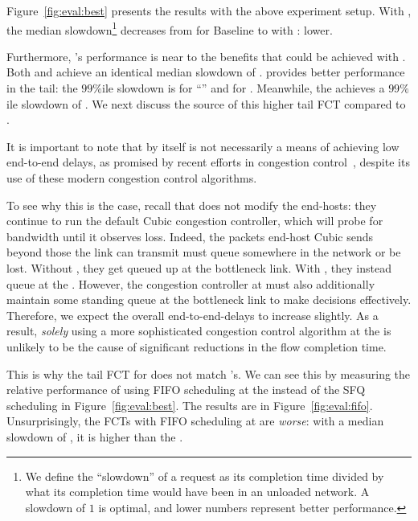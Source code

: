 Figure~\ref{fig:eval:best} presents the results with the above experiment setup.
With \name, the median 
slowdown\footnote{We define the ``slowdown'' of a request as its completion time divided by what its completion time would have been in an unloaded network. A slowdown of $1$ is optimal, and lower numbers represent better performance.} 
decreases from \overviewBenefitsBaselineMedian 
for Baseline to \overviewBenefitsBundlerMedian 
with \name: \overviewBenefitsBundlerMedianImprovement
lower.

Furthermore, \name's performance is near to the benefits that could be achieved with \optimal.
Both \name and \optimal achieve an identical median slowdown of \overviewBenefitsBundlerMedian.
\optimal provides better performance in the tail: the $99\%$ile slowdown is \overviewBenefitsOptimalTail for ``\optimal'' and \overviewBenefitsBundlerTail for \name.
Meanwhile, the \baseline achieves a $99\%$ile slowdown of \overviewBenefitsBaselineTail.
We next discuss the source of this higher tail FCT compared to \optimal.

 It is important to note that \name by itself is not necessarily a means of achieving low end-to-end delays, as promised by recent efforts in congestion control~\cite{copa, nimbus}, despite its use of these modern congestion control algorithms.

To see why this is the case, recall that \name does not modify the end-hosts: they continue to run the default Cubic congestion controller, which will probe for bandwidth until it observes loss.
Indeed, the packets end-host Cubic sends beyond those the link can transmit must queue somewhere in the network or be lost. Without \name, they get queued up at the bottleneck link.
With \name, they instead queue at the \inbox.
However, the congestion controller at \inbox must also additionally maintain some standing queue at the bottleneck link to make decisions effectively.
Therefore, we expect the overall end-to-end-delays to increase slightly.
As a result, \emph{solely} using a more sophisticated congestion control algorithm at the \name is unlikely to be the cause of significant reductions in the flow completion time.


This is why the tail FCT for \name does not match \optimal's.
We can see this by measuring the relative performance of using FIFO scheduling at the \name instead of the SFQ scheduling in Figure~\ref{fig:eval:best}.
The results are in Figure~\ref{fig:eval:fifo}. 
Unsurprisingly, the FCTs with FIFO scheduling at \name are \emph{worse}: with a median slowdown of \overviewBenefitsFifoMedian, it is \overviewBenefitsFifoWorse higher than the \baseline. 

